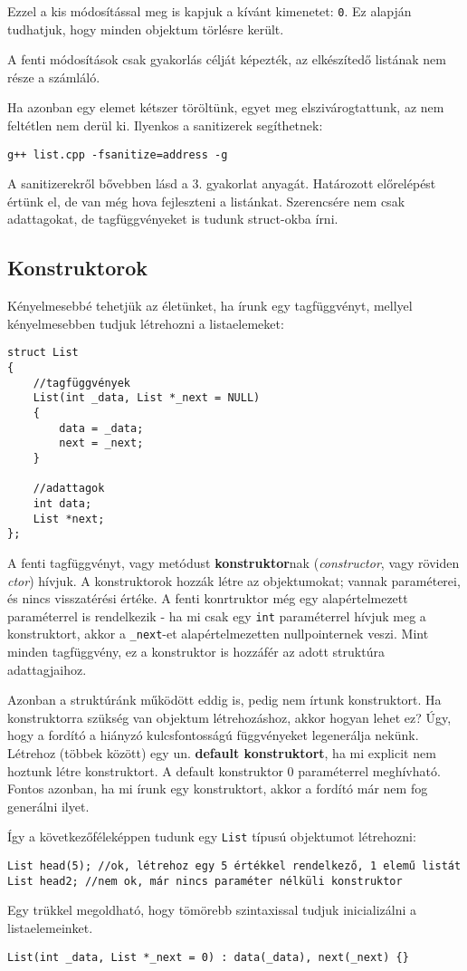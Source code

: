 \documentclass[../cpp_book/cpp_book.tex]{subfiles}
\begin{document}
	Ezzel a kis módosítással meg is kapjuk a kívánt kimenetet: \texttt{0}. Ez alapján tudhatjuk, hogy minden objektum törlésre került.
	\begin{note}
		A fenti módosítások csak gyakorlás célját képezték, az elkészítedő listának nem része a számláló.
	\end{note}
	Ha azonban egy elemet kétszer töröltünk, egyet meg elszivárogtattunk, az nem feltétlen nem derül ki. Ilyenkos a sanitizerek segíthetnek:
	\begin{center}
		\texttt{g++ list.cpp -fsanitize=address -g}
	\end{center}
  A sanitizerekről bővebben lásd a 3. gyakorlat anyagát.
	\medskip
	Határozott előrelépést értünk el, de van még hova fejleszteni a listánkat. Szerencsére nem csak adattagokat, de tagfüggvényeket is tudunk struct-okba írni.
	\subsection{Konstruktorok}
	Kényelmesebbé tehetjük az életünket, ha írunk egy tagfüggvényt, mellyel kényelmesebben tudjuk létrehozni a listaelemeket:
	\begin{lstlisting}
struct List
{
	//tagfüggvények
	List(int _data, List *_next = NULL)
	{
		data = _data;
		next = _next;
	}
	
	//adattagok
	int data;
	List *next;
};
	\end{lstlisting}
	A fenti tagfüggvényt, vagy metódust \textbf{konstruktor}nak (\textit{constructor}, vagy röviden \textit{ctor}) hívjuk. A konstruktorok hozzák létre az objektumokat; vannak paraméterei, és nincs visszatérési értéke. A fenti konrtruktor még egy alapértelmezett paraméterrel is rendelkezik - ha mi csak egy \texttt{int} paraméterrel hívjuk meg a konstruktort, akkor a \texttt{\_next}-et alapértelmezetten nullpointernek veszi. Mint minden tagfüggvény, ez a konstruktor is hozzáfér az adott struktúra adattagjaihoz.
	
	\medskip
	Azonban a struktúránk működött eddig is, pedig nem írtunk konstruktort. Ha konstruktorra szükség van objektum létrehozáshoz, akkor hogyan lehet ez? Úgy, hogy a fordító a hiányzó kulcsfontosságú függvényeket legenerálja nekünk. Létrehoz (többek között) egy un. \textbf{default konstruktort}, ha mi explicit nem hoztunk létre konstruktort. A default konstruktor 0 paraméterrel meghívható. Fontos azonban, ha mi írunk egy konstruktort, akkor a fordító már nem fog generálni ilyet.
	
	\medskip
	Így a következőféleképpen tudunk egy \texttt{List} típusú objektumot létrehozni:
	\begin{lstlisting}
List head(5); //ok, létrehoz egy 5 értékkel rendelkező, 1 elemű listát
List head2; //nem ok, már nincs paraméter nélküli konstruktor
	\end{lstlisting}
	Egy trükkel megoldható, hogy tömörebb szintaxissal tudjuk inicializálni a listaelemeinket.
	\begin{lstlisting}
List(int _data, List *_next = 0) : data(_data), next(_next) {}
	\end{lstlisting}
	
\end{document}
